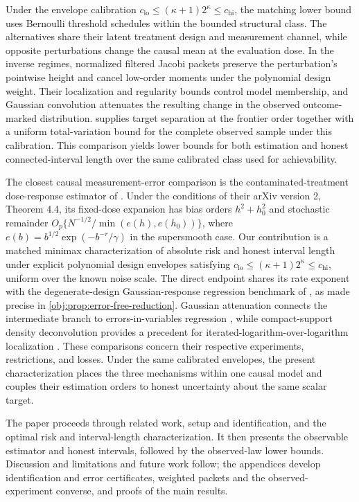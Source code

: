 \documentclass[11pt]{article}
\begin{document}
Under the envelope calibration \(c_{\mathrm{lo}}\le(\kappa+1)2^\kappa\le c_{\mathrm{hi}}\), the matching lower bound uses Bernoulli threshold schedules within the bounded structural class. The alternatives share their latent treatment design and measurement channel, while opposite perturbations change the causal mean at the evaluation dose. In the inverse regimes, normalized filtered Jacobi packets preserve the perturbation's pointwise height and cancel low-order moments under the polynomial design weight. Their localization and regularity bounds control model membership, and Gaussian convolution attenuates the resulting change in the observed outcome-marked distribution.  supplies target separation at the frontier order together with a uniform total-variation bound for the complete observed sample under this calibration. This comparison yields lower bounds for both estimation and honest connected-interval length over the same calibrated class used for achievability.

The closest causal measurement-error comparison is the contaminated-treatment dose-response estimator of \citet{HuangZhang2023}. Under the conditions of their arXiv version 2, Theorem 4.4, its fixed-dose expansion has bias orders \(h^2+h_0^2\) and stochastic remainder \(O_p\{N^{-1/2}/\min(e(h),e(h_0))\}\), where \(e(b)=b^{1/2}\exp(-b^{-r}/\gamma)\) in the supersmooth case. Our contribution is a matched minimax characterization of absolute risk and honest interval length under explicit polynomial design envelopes satisfying \(c_{\mathrm{lo}}\le(\kappa+1)2^\kappa\le c_{\mathrm{hi}}\), uniform over the known noise scale. The direct endpoint shares its rate exponent with the degenerate-design Gaussian-response regression benchmark of \citet[Definition 2 and Theorem 1]{Gaiffas2005}, as made precise in \cref{obj:prop:error-free-reduction}. Gaussian attenuation connects the intermediate branch to errors-in-variables regression \citep[Sections 3--4]{FanTruong1993}, while compact-support density deconvolution provides a precedent for iterated-logarithm-over-logarithm localization \citep[Theorems 1--2]{Meister2007}. These comparisons concern their respective experiments, restrictions, and losses. Under the same calibrated envelopes, the present characterization places the three mechanisms within one causal model and couples their estimation orders to honest uncertainty about the same scalar target.



The paper proceeds through related work, setup and identification, and the optimal risk and interval-length characterization. It then presents the observable estimator and honest intervals, followed by the observed-law lower bounds. Discussion and limitations and future work follow; the appendices develop identification and error certificates, weighted packets and the observed-experiment converse, and proofs of the main results.
\end{document}
